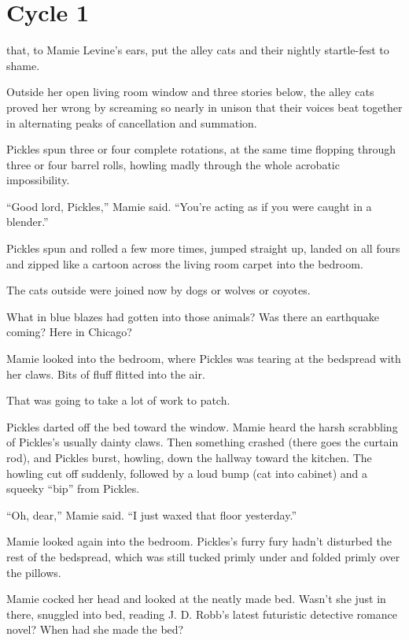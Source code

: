 \chapter{Cycle 1}


 that, to Mamie Levine's ears, put the alley cats and their nightly startle-fest to shame.

Outside her open living room window and three stories below, the alley cats proved her wrong by screaming so nearly in unison that their voices beat together in alternating peaks of cancellation and summation.

Pickles spun three or four complete rotations, at the same time flopping through three or four barrel rolls, howling madly through the whole acrobatic impossibility.

``Good lord, Pickles,'' Mamie said. ``You're acting as if you were caught in a blender.''

Pickles spun and rolled a few more times, jumped straight up, landed on all fours and zipped like a cartoon across the living room carpet into the bedroom.

The cats outside were joined now by dogs or wolves or coyotes.

What in blue blazes had gotten into those animals? Was there an earthquake coming? Here in Chicago?

Mamie looked into the bedroom, where Pickles was tearing at the bedspread with her claws. Bits of fluff flitted into the air.

That was going to take a lot of work to patch.

Pickles darted off the bed toward the window. Mamie heard the harsh scrabbling of Pickles's usually dainty claws. Then something crashed (there goes the curtain rod), and Pickles burst, howling, down the hallway toward the kitchen. The howling cut off suddenly, followed by a loud bump (cat into cabinet) and a squeeky ``bip'' from Pickles.

``Oh, dear,'' Mamie said. ``I just waxed that floor yesterday.''

Mamie looked again into the bedroom. Pickles's furry fury hadn't disturbed the rest of the bedspread, which was still tucked primly under and folded primly over the pillows.

Mamie cocked her head and looked at the neatly made bed. Wasn't she just in there, snuggled into bed, reading J. D. Robb's latest futuristic detective romance novel? When had she made the bed?


